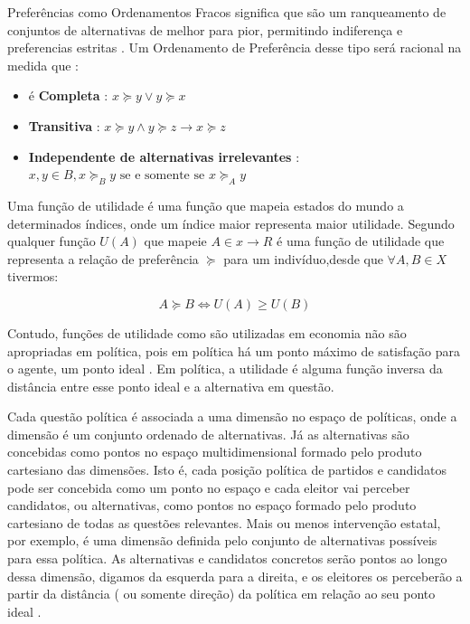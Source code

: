 Preferências como Ordenamentos Fracos significa que são um ranqueamento de
conjuntos de alternativas de melhor para pior, permitindo indiferença e
preferencias estritas \cite{munger2015choosing}. Um Ordenamento de Preferência
desse tipo será racional na medida que \cite[p.4]{gintis2009bounds} :
\begin{itemize}
\item é \textbf{Completa} : $x \succeq y \lor y \succeq x $
\item \textbf{Transitiva} :
  $x \succeq y \land y \succeq z \rightarrow x \succeq z$
\item \textbf{Independente de alternativas irrelevantes} : $x,y \in B, x \succeq_B y
  \text{ se e somente se } x \succeq_A y$
\end{itemize}

Uma função de utilidade é uma função que mapeia estados do mundo a determinados
índices, onde um índice maior representa maior utilidade. Segundo
 qualquer função $U(A)$ que mapeie $A \in x \to R$ é
uma função de utilidade que representa a relação de preferência $ \succeq$ para um
indivíduo,desde que $\forall A,B \in X$ tivermos:

$$ A \succeq B \iff U(A) \geq U(B)$$

Contudo, funções de utilidade como são utilizadas em economia não são
apropriadas em política, pois em política há um ponto máximo de satisfação para
o agente, um ponto ideal \cite{munger2015choosing}. Em política, a utilidade é
alguma função inversa da distância entre esse ponto ideal e a alternativa em
questão.



Cada questão política é associada a uma dimensão no espaço de políticas, onde a
dimensão é um conjunto ordenado de alternativas. Já as alternativas são
concebidas como pontos no espaço multidimensional formado pelo produto
cartesiano das dimensões. Isto é, cada posição política de partidos e candidatos
pode ser concebida como um ponto no espaço e cada eleitor vai perceber
candidatos, ou alternativas, como pontos no espaço formado pelo produto
cartesiano de todas as questões relevantes. Mais ou menos intervenção estatal,
por exemplo, é uma dimensão definida pelo conjunto de alternativas possíveis
para essa política. As alternativas e candidatos concretos serão pontos ao longo
dessa dimensão, digamos da esquerda para a direita, e os eleitores os perceberão
a partir da distância ( ou somente direção) da política em relação ao seu ponto
ideal \cite{munger2015choosing}.


